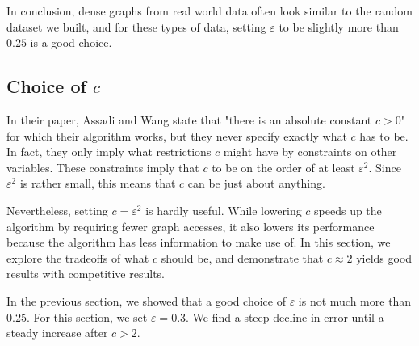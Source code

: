 \documentclass[
]{article}
\begin{document}
In conclusion, dense graphs from real world data often look similar to the random dataset
we built, and for these types of data, setting {\(\varepsilon\)} to be
slightly more than {\(0.25\)} is a good choice.

\hypertarget{choice-of-c}{%
  \subsection{\texorpdfstring{Choice of
        {\(c\)}}{Choice of c}}\label{choice-of-c}}

In their paper, Assadi and Wang state that "there is an absolute
constant {\(c > 0\)}" for which their algorithm works, but they never
specify exactly what {\(c\)} has to be. In fact, they only imply what
restrictions {\(c\)} might have by constraints on other variables. These
constraints imply that {\(c\)} to be on the order of at least
  {\(\varepsilon^{2}\)}. Since {\(\varepsilon^{2}\)} is rather small, this
means that {\(c\)} can be just about anything.

Nevertheless, setting {\(c = \varepsilon^{2}\)} is hardly useful. While
lowering {\(c\)} speeds up the algorithm by requiring fewer graph
accesses, it also lowers its performance because the algorithm has less
information to make use of. In this section, we explore the tradeoffs of
what {\(c\)} should be, and demonstrate that {\(c \approx 2\)} yields
good results with competitive results.

In the previous section, we showed that a good choice of
  {\(\varepsilon\)} is not much more than {\(0.25\)}. For this section, we
set {\(\varepsilon = 0.3\)}. We find a steep decline in error until a steady increase after $c > 2$.
\end{document}
